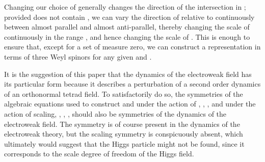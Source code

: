 \documentclass[a4paper,twocolumn,showpacs,preprintnumbers,aps]{revtex4}
\begin{document}
Changing our choice of \myHighlight{$\overline{\chi}\gamma^\mu\chi\in \TZ$}\coordHE{} generally changes the
direction of the intersection \coordHE{} in \coordHE{}; provided \myHighlight{$\TZ$}\coordHE{} does not contain
\coordHE{}, we can vary the direction of \coordHE{}
relative to \coordHE{} continuously between almost
parallel and almost anti-parallel, thereby changing the scale of \myHighlight{$\xi$}\coordHE{} continuously in the
range \coordHE{}, and hence changing the scale of \coordHE{}. This is
enough to ensure that, except for a set of measure zero, we can construct a representation
in terms of three Weyl spinors for any given \coordHE{} and \coordHE{}.

It is the suggestion of this paper that the dynamics of the electroweak
field has its particular form because it describes a perturbation of a
second order dynamics of an orthonormal tetrad field. To satisfactorily do so, the
symmetries of the algebraic equations used to construct \myHighlight{$\psi$}\coordHE{} and \myHighlight{$\chi$}\coordHE{}
under the action of \coordHE{}, \coordHE{}, \coordHE{}, and under
the action of scaling, \myHighlight{$\Phi=\alpha\Phi$}\coordHE{}, \coordHE{},
\myHighlight{$\alpha\in\RR^+$}\coordHE{}, should also be symmetries of the dynamics of the
electroweak field. The \coordHE{} symmetry is of course present in the dynamics
of the electroweak theory, but the scaling symmetry is conspicuously absent,
which ultimately would suggest that the Higgs particle might not be found, since it
corresponds to the scale degree of freedom of the Higgs field.
\end{document}

